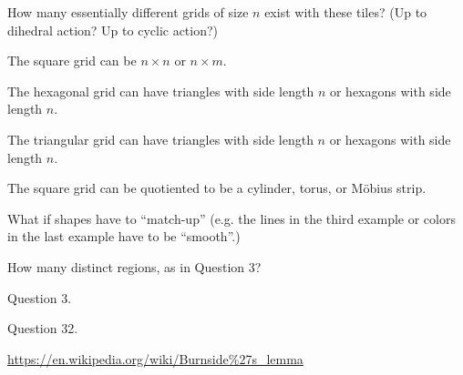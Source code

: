 \documentclass{article}
\begin{document}
\begin{question}
  How many essentially different grids of size $n$ exist with these tiles?
  (Up to dihedral action? Up to cyclic action?)
\end{question}
\begin{related}
  \item The square grid can be $n \times n$ or $n \times m$.
  \item The hexagonal grid can have triangles with side length $n$ or hexagons with side length $n$.
  \item The triangular grid can have triangles with side length $n$ or hexagons with side length $n$.
  \item The square grid can be quotiented to be a cylinder, torus, or M\"obius strip.
  \item What if shapes have to ``match-up'' (e.g. the lines in the third example
    or colors in the last example have to be ``smooth''.)
  \item How many distinct regions, as in Question 3?
\end{related}
\begin{references}
  \item Question 3.
  \item Question 32.
  \item \url{https://en.wikipedia.org/wiki/Burnside%27s_lemma}
\end{references}
\end{document}
